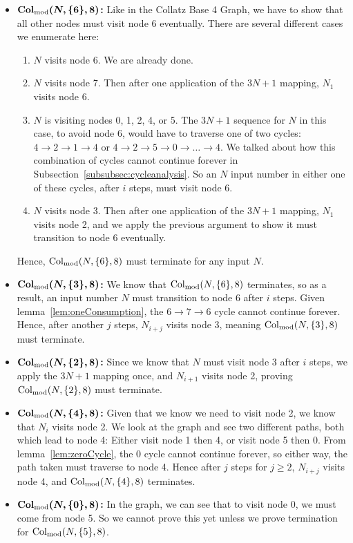 \begin{itemize}
    \item \textbf{$\boldsymbol{\mathrm{Col}_{\text{mod}}(N,\{6\},8)}$:} Like in the Collatz Base 4 Graph, we have to show that all other nodes must visit node 6 eventually. There are several different cases we enumerate here:
\begin{enumerate}
\item $N$ visits node 6. We are already done.
\item $N$ visits node 7. Then after one application of the $3N+1$ mapping, $N_1$ visits node 6.
\item $N$ is visiting nodes 0, 1, 2, 4, or 5. The $3N+1$ sequence for $N$ in this case, to avoid node 6, would have to traverse one of two cycles: $4 \rightarrow 2 \rightarrow 1 \rightarrow 4$ or $4 \rightarrow 2 \rightarrow 5 \rightarrow 0 \rightarrow \ldots \rightarrow 4$.  We talked about how this combination of cycles cannot continue forever in Subsection~\ref{subsubsec:cycleanalysis}. So an $N$ input number in either one of these cycles, after $i$ steps, must visit node 6.
\item $N$ visits node 3. Then after one application of the $3N+1$ mapping, $N_1$ visits node 2, and we apply the previous argument to show it must transition to node 6 eventually.
\end{enumerate}  
Hence, $\mathrm{Col}_{\text{mod}}(N,\{6\},8)$ must terminate for any input $N$.
    \item \textbf{$\boldsymbol{\mathrm{Col}_{\text{mod}}(N,\{3\},8)}$:} We know that $\mathrm{Col}_{\text{mod}}(N,\{6\},8)$ terminates, so as a result, an input number $N$ must transition to node 6 after $i$ steps. Given lemma~\ref{lem:oneConsumption}, the $6 \rightarrow 7 \rightarrow 6$ cycle cannot continue forever. Hence, after another $j$ steps, $N_{i+j}$ visits node 3, meaning $\mathrm{Col}_{\text{mod}}(N,\{3\},8)$ must terminate.
    \item \textbf{$\boldsymbol{\mathrm{Col}_{\text{mod}}(N,\{2\},8)}$:} Since we know that $N$ must visit node 3 after $i$ steps, we apply the $3N+1$ mapping once, and $N_{i+1}$ visits node 2, proving $\mathrm{Col}_{\text{mod}}(N,\{2\},8)$ must terminate.
    \item \textbf{$\boldsymbol{\mathrm{Col}_{\text{mod}}(N,\{4\},8)}$:} Given that we know we need to visit node 2, we know that $N_i$ visits node 2. We look at the graph and see two different paths, both which lead to node 4: Either visit node 1 then 4, or visit node 5 then 0. From lemma~\ref{lem:zeroCycle}, the 0 cycle cannot continue forever, so either way, the path taken must traverse to node 4. Hence after $j$ steps for $j \geq 2$, $N_{i+j}$ visits node 4, and $\mathrm{Col}_{\text{mod}}(N,\{4\},8)$ terminates.
    \item \textbf{$\boldsymbol{\mathrm{Col}_{\text{mod}}(N,\{0\},8)}$:} In the graph, we can see that to visit node 0, we must come from node 5. So we cannot prove this yet unless we prove termination for $\mathrm{Col}_{\text{mod}}(N,\{5\},8)$.
\end{itemize}

